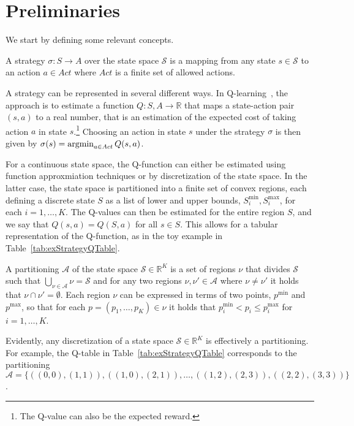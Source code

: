 \section{Preliminaries}%
\label{sec:preliminaries}

We start by defining some relevant concepts.

\begin{definition}[Strategy]%
    A strategy $\sigma : S \to A$ over the state space $\mathcal{S}$ is a
    mapping from any state $s \in \mathcal{S}$ to an action $a \in Act$ where
    $Act$ is a finite set of allowed actions. 
\end{definition}

A strategy can be represented in several different ways. In
Q-learning~\cite{Sutton1998}, the approach is to estimate a function $Q : S, A
\to \mathbb{R}$ that maps a state-action pair $(s,a)$ to a real number, that is
an estimation of the expected cost of taking action $a$ in state
$s$.\footnote{The Q-value can also be the expected reward.} Choosing an action
in state $s$ under the strategy $\sigma$ is then given by $\sigma(s) =
\operatorname*{argmin}_{a \in Act}Q(s,a)$.

For a continuous state space, the Q-function can either be estimated using
function approxmiation techniques or by discretization of the state space. In
the latter case, the state space is partitioned into a finite set of convex
regions, each defining a discrete state $S$ as a list of lower and upper bounds,
$S_i^{\min}, S_i^{\max}$, for each $i = 1,\ldots,K$. The Q-values can then be
estimated for the entire region $S$, and we say that $Q(s,a) = Q(S,a)$ for all
$s \in S$. This allows for a tabular representation of the Q-function, as in the
toy example in Table~\ref{tab:exStrategyQTable}.

\begin{definition}[Partitions]%
    A partitioning $\mathcal{A}$ of the state space $\mathcal{S} \in
    \mathbb{R}^K$ is a set of regions $\nu$ that divides $\mathcal{S}$ such that
    $\bigcup_{\nu \in \mathcal{A}}\nu = \mathcal{S}$ and for any two regions
    $\nu, \nu' \in \mathcal{A}$ where $\nu \neq \nu'$ it holds that $\nu \cap
    \nu' = \emptyset$. Each region $\nu$ can be expressed in terms of two
    points, $p^{\min}$ and $p^{\max}$, so that for each $p = (p_1, \ldots, p_K)
    \in \nu$ it holds that $p^{\min}_i < p_i \le  p^{\max}_i$ for $i =
    1,\ldots,K$.
\end{definition}

Evidently, any discretization of a state space $\mathcal{S} \in \mathbb{R}^K$ is
effectively a partitioning. For example, the Q-table in
Table~\ref{tab:exStrategyQTable} corresponds to the partitioning $\mathcal{A} =
\{ ((0,0),(1,1)), ((1,0),(2,1)),\ldots, ((1,2),(2,3)), ((2,2),(3,3)) \}$.



